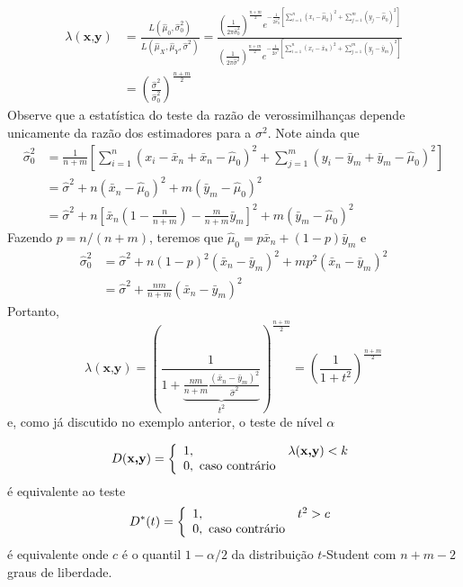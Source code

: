 \documentclass[
  letterpaper,
  DIV=11,
  numbers=noendperiod]{scrartcl}
\begin{document}
\[\begin{align}
\lambda(\textbf{x,y})&=\frac{L(\hat{\mu}_0,\hat{\sigma}_0^2)}{L(\hat{\mu}_X,\hat{\mu}_Y,\hat{\sigma}^2)}=\frac{\left(\frac{1}{2\pi\hat{\sigma}^2_0}\right)^{\frac{n+m}{2}}e^{-\frac{1}{2\hat{\sigma}^2_0}\left[\sum_{i=1}^n(x_i-\hat{\mu}_0)^2+\sum_{j=1}^m(y_j-\hat{\mu}_0)^2\right]}}{\left(\frac{1}{2\pi\hat{\sigma}^2}\right)^{\frac{n+m}{2}}e^{-\frac{1}{2\hat{\sigma}^2}\left[\sum_{i=1}^n(x_i-\bar{x}_n)^2+\sum_{j=1}^m(y_j-\bar{y}_m)^2\right]}}\\
&=\left(\frac{\hat{\sigma}^2}{\hat{\sigma}_0^2}\right)^{\frac{n+m}{2}}
\end{align}\] Observe que a estatística do teste da razão de
verossimilhanças depende unicamente da razão dos estimadores para a
\(\sigma^2\). Note ainda que
\[\begin{align}\hat{\sigma}^2_0&=\frac{1}{n+m}\left[\sum_{i=1}^n(x_i-\bar{x}_n+\bar{x}_n-\hat{\mu}_0)^2+\sum_{j=1}^m(y_i-\bar{y}_m+\bar{y}_m-\hat{\mu}_0)^2\right]\\&=\hat{\sigma}^2+n(\bar{x}_n-\hat{\mu}_0)^2+m(\bar{y}_m-\hat{\mu}_0)^2\\&=
\hat{\sigma}^2+n\left[\bar{x}_n\left(1-\frac{n}{n+m}\right)-\frac{m}{n+m}\bar{y}_m\right]^2+m(\bar{y}_m-\hat{\mu}_0)^2\end{align}\]
Fazendo \(p=n/(n+m)\), teremos que
\(\hat{\mu}_0=p\bar{x}_n+(1-p)\bar{y}_m\) e
\[\begin{align}\hat{\sigma}^2_0&=
\hat{\sigma}^2+n(1-p)^2\left(\bar{x}_n-\bar{y}_m\right)^2+mp^2(\bar{x}_n-\bar{y}_m)^2\\&=\hat{\sigma}^2+\frac{nm}{n+m}\left(\bar{x}_n-\bar{y}_m\right)^2\end{align}\]
Portanto,
\[\lambda(\textbf{x,y})=\left(\frac{1}{1+\underbrace{\frac{nm}{n+m}\frac{(\bar{x}_n-\bar{y}_m)^2}{\hat{\sigma}^2}}_{t^2}}\right)^{\frac{n+m}{2}}=\left(\frac{1}{1+t^2}\right)^{\frac{n+m}{2}}\]
e, como já discutido no exemplo anterior, o teste de nível \(\alpha\)

\[D(\textbf{x,y})=\left\{\begin{array}{ll}1,&\lambda(\textbf{x,y})<k\\0,\hbox{ caso contrário}\end{array}\right.\]
é equivalente ao teste
\[D^*(t)=\left\{\begin{array}{ll}1,&t^2>c\\0,\hbox{ caso contrário}\end{array}\right.\]
é equivalente onde \(c\) é o quantil \(1-\alpha/2\) da distribuição
\(t\)-Student com \(n+m-2\) graus de liberdade.
\end{document}
